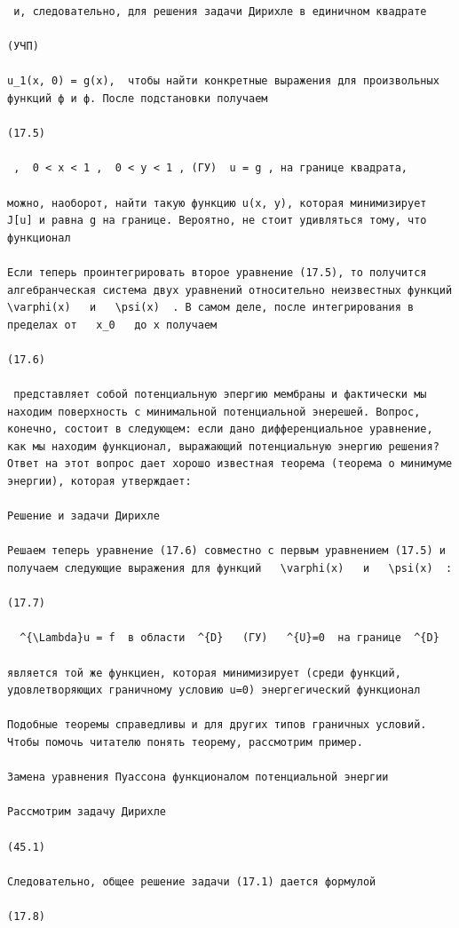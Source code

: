 \documentclass[
  ukrainian,
]{article}
\begin{document}
\begin{verbatim}
 и, следовательно, для решения задачи Дирихле в единичном квадрате

(УЧП) 

u_1(x, 0) = g(x),  чтобы найти конкретные выражения для произвольных функций ф и ф. После подстановки получаем

(17.5)

 ,  0 < x < 1 ,  0 < y < 1 , (ГУ)  u = g , на границе квадрата,

можно, наоборот, найти такую функцию u(x, y), которая минимизирует J[u] и равна g на границе. Вероятно, не стоит удивляться тому, что функционал

Если теперь проинтегрировать второе уравнение (17.5), то получится алгебранческая система двух уравнений относительно неизвестных функций   \varphi(x)   и   \psi(x)  . В самом деле, после интегрирования в пределах от   x_0   до x получаем

(17.6)

 представляет собой потенциальную эпергию мембраны и фактически мы находим поверхность с минимальной потенциальной энерешей. Вопрос, конечно, состоит в следующем: если дано дифференциальное уравнение, как мы находим функционал, выражающий потенциальную энергию решения? Ответ на этот вопрос дает хорошо известная теорема (теорема о минимуме энергии), которая утверждает:

Решение и задачи Дирихле

Решаем теперь уравнение (17.6) совместно с первым уравнением (17.5) и получаем следующие выражения для функций   \varphi(x)   и   \psi(x)  :

(17.7)

  ^{\Lambda}u = f  в области  ^{D}   (ГУ)   ^{U}=0  на границе  ^{D} 

является той же функциен, которая минимизирует (среди функций, удовлетворяющих граничному условию u=0) энергегический функционал

Подобные теоремы справедливы и для других типов граничных условий. Чтобы помочь читателю понять теорему, рассмотрим пример.

Замена уравнения Пуассона функционалом потенциальной энергии

Рассмотрим задачу Дирихле

(45.1)

Следовательно, общее решение задачи (17.1) дается формулой

(17.8)


\end{verbatim}
\end{document}
